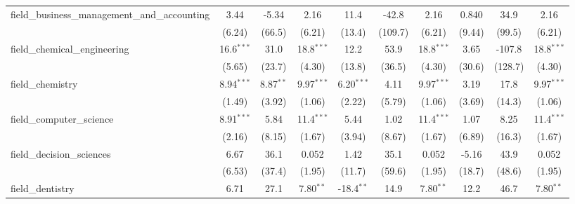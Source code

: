 \begin{tabular}{lccccccccc}
   field\_business\_management\_and\_accounting                & 3.44          & -5.34         & 2.16          & 11.4           & -42.8          & 2.16          & 0.840         & 34.9          & 2.16\\   
                                                               & (6.24)        & (66.5)        & (6.21)        & (13.4)         & (109.7)        & (6.21)        & (9.44)        & (99.5)        & (6.21)\\   
   field\_chemical\_engineering                                & 16.6$^{***}$  & 31.0          & 18.8$^{***}$  & 12.2           & 53.9           & 18.8$^{***}$  & 3.65          & -107.8        & 18.8$^{***}$\\   
                                                               & (5.65)        & (23.7)        & (4.30)        & (13.8)         & (36.5)         & (4.30)        & (30.6)        & (128.7)       & (4.30)\\   
   field\_chemistry                                            & 8.94$^{***}$  & 8.87$^{**}$   & 9.97$^{***}$  & 6.20$^{***}$   & 4.11           & 9.97$^{***}$  & 3.19          & 17.8          & 9.97$^{***}$\\   
                                                               & (1.49)        & (3.92)        & (1.06)        & (2.22)         & (5.79)         & (1.06)        & (3.69)        & (14.3)        & (1.06)\\   
   field\_computer\_science                                    & 8.91$^{***}$  & 5.84          & 11.4$^{***}$  & 5.44           & 1.02           & 11.4$^{***}$  & 1.07          & 8.25          & 11.4$^{***}$\\   
                                                               & (2.16)        & (8.15)        & (1.67)        & (3.94)         & (8.67)         & (1.67)        & (6.89)        & (16.3)        & (1.67)\\   
   field\_decision\_sciences                                   & 6.67          & 36.1          & 0.052         & 1.42           & 35.1           & 0.052         & -5.16         & 43.9          & 0.052\\   
                                                               & (6.53)        & (37.4)        & (1.95)        & (11.7)         & (59.6)         & (1.95)        & (18.7)        & (48.6)        & (1.95)\\   
   field\_dentistry                                            & 6.71          & 27.1          & 7.80$^{**}$   & -18.4$^{**}$   & 14.9           & 7.80$^{**}$   & 12.2          & 46.7          & 7.80$^{**}$\\   

\end{tabular}
